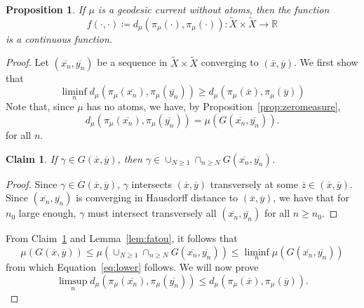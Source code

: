 \documentclass[12pt,article]{amsart}
\numberwithin{equation}{section}
\numberwithin{figure}{section}
\newtheorem{claim}[equation]{Claim}
\newtheorem{proposition}[equation]{Proposition}
\theoremstyle{definition}
\theoremstyle{plain}
\newcommand*{\wt}[1]{\widetilde{#1}}
\begin{document}
\begin{proposition}
If $\mu$ is a geodesic current without atoms, then the function
\[f(\cdot, \cdot) \coloneqq d_{\mu}(\pi_{\mu}(\cdot ), \pi_{\mu}(\cdot)) \colon \wt{X} \times \wt{X} \to \mathbb{R}\] is a continuous function.
\label{prop:contdistance}
\end{proposition}
\begin{proof}
Let $\left( \overline{x_n}, \overline{y_n} \right)$ be a sequence in $\wt{X} \times \wt{X}$ converging to $(\overline{x}, \overline{y})$.
We first show that
\begin{equation} \liminf_n d_{\mu}(\pi_{\mu}(\overline{x_n}), \pi_{\mu}(\overline{y_n})) \geq d_{\mu}(\pi_{\mu}(\overline{x}), \pi_{\mu}(\overline{y}))
\label{eq:lower}
\end{equation}
Note that, since $\mu$ has no atoms, we have, by Proposition~\ref{prop:zeromeasure},
\[
d_{\mu}(\pi_{\mu}(\overline{x_n}), \pi_{\mu}(\overline{y_n})) = \mu(G(\overline{x_n},\overline{y_n})).
\]
for all $n$.
\begin{claim}
If $\gamma \in G(\overline{x},\overline{y})$, then $\gamma \in \cup_{N \geq 1} \cap_{n \geq N} G(\overline{x_n},\overline{y_n})$.
\label{claim:lim_inf}
\end{claim}
\begin{proof}
Since $\gamma \in G(\overline{x},\overline{y})$, $\gamma$ intersects $(\overline{x},\overline{y})$ transversely at some $\overline{z} \in (\overline{x},\overline{y})$. Since
$(\overline{x_n},\overline{y_n})$ is converging in Hausdorff distance to $(\overline{x},\overline{y})$, we have that for $n_0$ large enough, $\gamma$ must intersect transversely all $(\overline{x_n},\overline{y_n})$ for all $n \geq n_0$.
\end{proof}
From Claim~\ref{claim:lim_inf} and Lemma~\ref{lem:fatou}, it follows that 
\[
\mu(G(\overline{x},\overline{y})) \leq \mu \left( \cup_{N \geq 1} \cap_{n \geq N} G(\overline{x_n},\overline{y_n})\right) \leq \liminf_n \mu(G(\overline{x_n},\overline{y_n}))
\]
from which Equation~\ref{eq:lower} follows.
We will now prove 
\begin{equation} \limsup_n d_{\mu}(\pi_{\mu}(\overline{x_n}), \pi_{\mu}(\overline{y_n})) \leq d_{\mu}(\pi_{\mu}(\overline{x}), \pi_{\mu}(\overline{y})).
\label{eq:upper}
\end{equation}





\end{proof}
\end{document}
